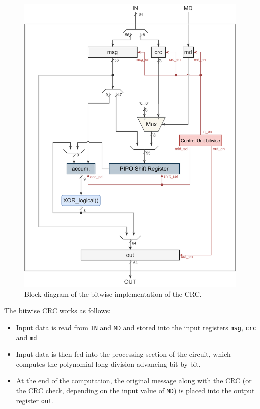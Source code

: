\begin{figure}[H]
    \begin{center}
        \includegraphics[scale=.85,clip]{img/block_diagram_bitwise.pdf}
    \end{center}
    \vspace*{-0.5cm}
    \caption{Block diagram of the bitwise implementation of the CRC.}
    \label{fig:block_diagram_bitwise}
\end{figure}

\hfill \break
The bitwise CRC works as follows:
\begin{itemize}
	\item Input data is read from \texttt{IN} and \texttt{MD} and stored into the input registers \texttt{msg}, \texttt{crc} and \texttt{md}
	\item Input data is then fed into the processing section of the circuit, which computes the polynomial long division advancing bit by bit.
	\item At the end of the computation, the original message along with the CRC (or the CRC check, depending on the input value of \texttt{MD}) is placed into the output register \texttt{out}.
\end{itemize}


